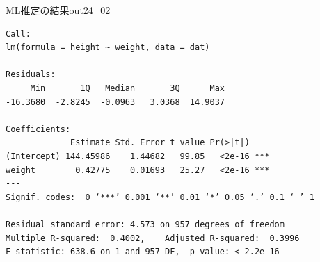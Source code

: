 \begin{Rscreen}{ML推定の結果}{out24_02}
	\begin{verbatim}
Call:
lm(formula = height ~ weight, data = dat)

Residuals:
     Min       1Q   Median       3Q      Max 
-16.3680  -2.8245  -0.0963   3.0368  14.9037 

Coefficients:
             Estimate Std. Error t value Pr(>|t|)    
(Intercept) 144.45986    1.44682   99.85   <2e-16 ***
weight        0.42775    0.01693   25.27   <2e-16 ***
---
Signif. codes:  0 ‘***’ 0.001 ‘**’ 0.01 ‘*’ 0.05 ‘.’ 0.1 ‘ ’ 1

Residual standard error: 4.573 on 957 degrees of freedom
Multiple R-squared:  0.4002,	Adjusted R-squared:  0.3996 
F-statistic: 638.6 on 1 and 957 DF,  p-value: < 2.2e-16\end{verbatim}
\end{Rscreen}
